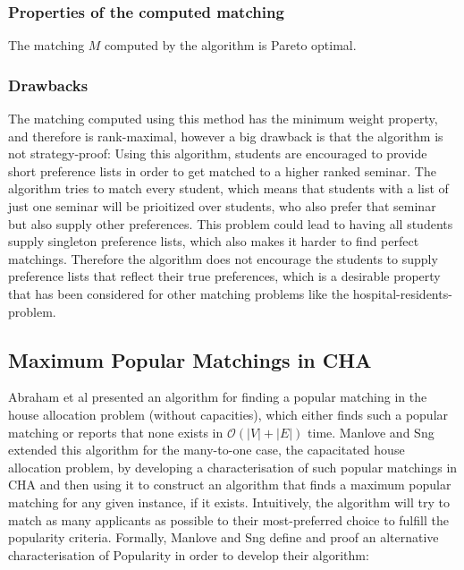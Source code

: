 \subsubsection{Properties of the computed matching}
The matching $M$ computed by the algorithm is Pareto optimal. \cite{SngThesis}

\subsubsection{Drawbacks}
The matching computed using this method has the minimum weight property, and therefore is rank-maximal, however a big drawback is that the algorithm is not strategy-proof: Using this algorithm, students are encouraged to provide short preference lists in order to get matched to a higher ranked seminar. The algorithm tries to match every student, which means that students with a list of just one seminar will be prioitized over students, who also prefer that seminar but also supply other preferences. This problem could lead to having all students supply singleton preference lists, which also makes it harder to find perfect matchings. Therefore the algorithm does not encourage the students to supply preference lists that reflect their true preferences, which is a desirable property that has been considered for other matching problems like the hospital-residents-problem.\cite{Gusfield}

\subsection{Maximum Popular Matchings in CHA}
Abraham et al \cite{AbrahamPopular} presented an algorithm for finding a popular matching in the house allocation problem (without capacities), which either finds such a popular matching or reports that none exists in $\mathcal{O}(|V| + |E|)$ time. Manlove and Sng \cite{ManlovePopularMatchings} extended this algorithm for the many-to-one case, the capacitated house allocation problem, by developing a characterisation of such popular matchings in CHA and then using it to construct an algorithm that finds a maximum popular matching for any given instance, if it exists. 
Intuitively, the algorithm will try to match as many applicants as possible to their most-preferred choice to fulfill the popularity criteria. Formally, Manlove and Sng\cite{ManlovePopularMatchings} define and proof an alternative characterisation of Popularity in order to develop their algorithm:

